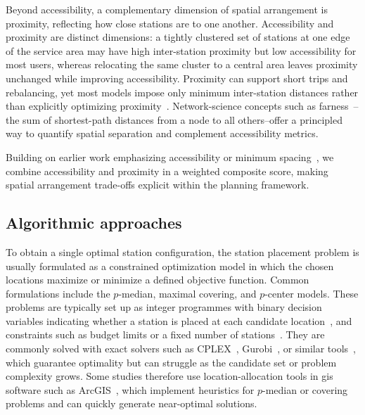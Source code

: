 Beyond accessibility, a complementary dimension of spatial arrangement is proximity, reflecting how close stations are to one another. Accessibility and proximity are distinct dimensions: a tightly clustered set of stations at one edge of the service area may have high inter-station proximity but low accessibility for most users, whereas relocating the same cluster to a central area leaves proximity unchanged while improving accessibility. Proximity can support short trips and rebalancing, yet most models impose only minimum inter-station distances rather than explicitly optimizing proximity~\cite{Nikiforiadis2021, Kabak2018}. Network-science concepts such as farness~\cite{Sabidussi1966}--the sum of shortest-path distances from a node to all others--offer a principled way to quantify spatial separation and complement accessibility metrics.

Building on earlier work emphasizing accessibility or minimum spacing~\cite{Frade2015, Cintrano2018, Lin2011, Mete2018, Nikiforiadis2021, Kabak2018}, we combine accessibility and proximity in a weighted composite score, making spatial arrangement trade-offs explicit within the planning framework.


\subsection{Algorithmic approaches}

To obtain a single optimal station configuration, the station placement problem is usually formulated as a constrained optimization model in which the chosen locations maximize or minimize a defined objective function. Common formulations include the $p$-median, maximal covering, and $p$-center models. These problems are typically set up as integer programmes with binary decision variables indicating whether a station is placed at each candidate location~\cite{Frade2015, Lin2011, Mete2018, Cintrano2018}, and constraints such as budget limits or a fixed number of stations~\cite{Conrow2018, Nikiforiadis2021, Caggiani2020}. They are commonly solved with exact solvers such as CPLEX~\cite{Mete2018, Chou2019}, Gurobi~\cite{Mix2022}, or similar tools~\cite{Lin2011, Conrow2018}, which guarantee optimality but can struggle as the candidate set or problem complexity grows. Some studies therefore use location-allocation tools in \ac{gis} software such as ArcGIS~\cite{GarciaPalomares2012, Ebrahimi2022}, which implement heuristics for $p$-median or covering problems and can quickly generate near-optimal solutions.

